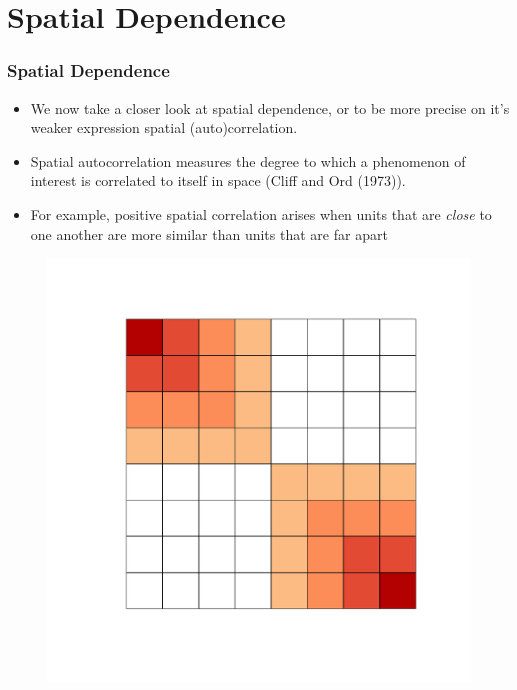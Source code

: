 \documentclass[
  shownotes,
  xcolor={svgnames},
  hyperref={colorlinks,citecolor=DarkBlue,linkcolor=andesred,urlcolor=DarkBlue}
  , aspectratio=169]{beamer}
\begin{document}
\section{Spatial Dependence}

\begin{frame}[fragile]
\frametitle{Spatial Dependence}


    \begin{minipage}[t]{0.52\linewidth}
\bigskip
\begin{itemize}
  \small
   \item We now take a closer look at spatial dependence, or to be more precise on it's weaker expression spatial (auto)correlation. 
  \medskip

  \item Spatial autocorrelation measures the degree to which a phenomenon of interest is correlated to itself in space (Cliff and Ord (1973)). 
  \medskip
  \item For example, positive spatial correlation arises when units that are {\it close} to one another are more similar than units that are far apart
\end{itemize}

    \end{minipage}
    \hfill
    \begin{minipage}[t]{0.43\linewidth}%
       \medskip
        \begin{figure}[H] 
         
          \includegraphics[scale=.35]{figures/spatial_correlation.pdf}
          
         

  \end{figure}
    \end{minipage}

\end{frame}
\end{document}
